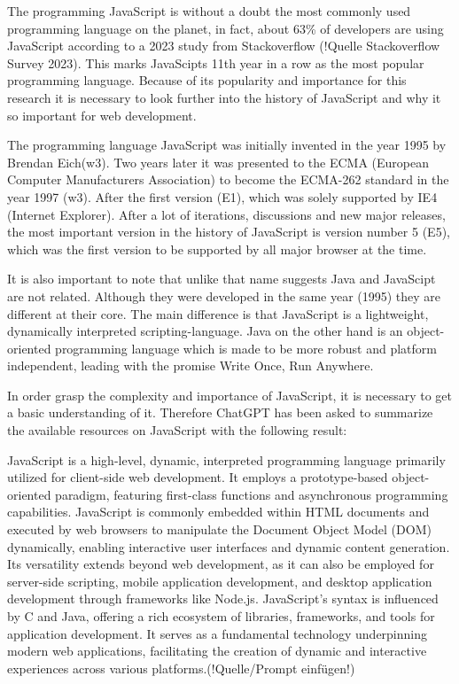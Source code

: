 The programming JavaScript is without a doubt the most commonly used programming language on the planet, in fact, about 63\% of developers are using JavaScript according to a 2023 study from Stackoverflow (!Quelle Stackoverflow Survey 2023). This marks JavaScipts 11th year in a row as the most popular programming language. Because of its popularity and importance for this research it is necessary to look further into the history of JavaScript and why it so important for web development.

The programming language JavaScript was initially invented in the year 1995 by Brendan Eich(w3). Two years later it was presented to the ECMA (European Computer Manufacturers Association) to become the ECMA-262 standard in the year 1997 (w3). After the first version (E1), which was solely supported by IE4 (Internet Explorer).
After a lot of iterations, discussions and new major releases, the most important version in the history of JavaScript is version number 5 (E5), which was the first version to be supported by all major browser at the time.

It is also important to note that unlike that name suggests Java and JavaScipt are not related. Although they were developed in the same year (1995) they are different at their core. The main difference is that JavaScript is a lightweight, dynamically interpreted scripting-language. Java on the other hand is an object-oriented programming language which is made to be more robust and platform independent, leading with the promise \dq Write Once, Run Anywhere\dq .

In order grasp the complexity and importance of JavaScript, it is necessary to get a basic understanding of it. Therefore ChatGPT has been asked to summarize the available resources on JavaScript with the following result:

\dq JavaScript is a high-level, dynamic, interpreted programming language primarily utilized for client-side web development. It employs a prototype-based object-oriented paradigm, featuring first-class functions and asynchronous programming capabilities. JavaScript is commonly embedded within HTML documents and executed by web browsers to manipulate the Document Object Model (DOM) dynamically, enabling interactive user interfaces and dynamic content generation. Its versatility extends beyond web development, as it can also be employed for server-side scripting, mobile application development, and desktop application development through frameworks like Node.js. JavaScript's syntax is influenced by C and Java, offering a rich ecosystem of libraries, frameworks, and tools for application development. It serves as a fundamental technology underpinning modern web applications, facilitating the creation of dynamic and interactive experiences across various platforms.\dq (!Quelle/Prompt einfügen!)


